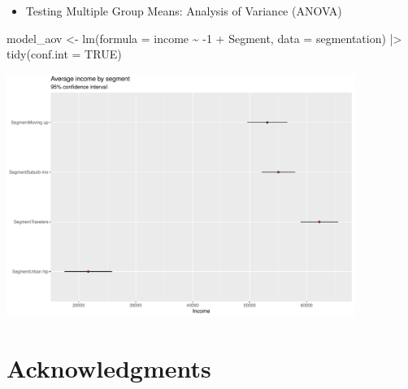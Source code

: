 \documentclass[
  ignorenonframetext,
]{beamer}
\newenvironment{Shaded}{\begin{snugshade}}{\end{snugshade}}
\newcommand{\AttributeTok}[1]{\textcolor[rgb]{0.40,0.45,0.13}{#1}}
\newcommand{\ConstantTok}[1]{\textcolor[rgb]{0.56,0.35,0.01}{#1}}
\newcommand{\DecValTok}[1]{\textcolor[rgb]{0.68,0.00,0.00}{#1}}
\newcommand{\FunctionTok}[1]{\textcolor[rgb]{0.28,0.35,0.67}{#1}}
\newcommand{\NormalTok}[1]{\textcolor[rgb]{0.00,0.23,0.31}{#1}}
\newcommand{\OtherTok}[1]{\textcolor[rgb]{0.00,0.23,0.31}{#1}}
\newcommand{\SpecialCharTok}[1]{\textcolor[rgb]{0.37,0.37,0.37}{#1}}
\providecommand{\tightlist}{%
  \setlength{\itemsep}{0pt}\setlength{\parskip}{0pt}}\usepackage{longtable,booktabs,array}
\begin{document}
\begin{frame}[fragile]{}
\label{section-39}
\begin{itemize}
\tightlist
\item
  Testing Multiple Group Means: Analysis of Variance (ANOVA)
\end{itemize}

\tiny

\begin{Shaded}
\begin{Highlighting}[]
\NormalTok{model\_aov }\OtherTok{\textless{}{-}} \FunctionTok{lm}\NormalTok{(}\AttributeTok{formula =}\NormalTok{ income }\SpecialCharTok{\textasciitilde{}} \SpecialCharTok{{-}}\DecValTok{1} \SpecialCharTok{+}\NormalTok{ Segment,}
                 \AttributeTok{data =}\NormalTok{ segmentation) }\SpecialCharTok{|\textgreater{}} 
  \FunctionTok{tidy}\NormalTok{(}\AttributeTok{conf.int =} \ConstantTok{TRUE}\NormalTok{)}
\end{Highlighting}
\end{Shaded}

\begin{center}
\includegraphics[width=0.85\textwidth,height=\textheight]{006_comparing_groups_statistical_tests_files/figure-beamer/unnamed-chunk-36-1.pdf}
\end{center}
\end{frame}

\section{Acknowledgments}\label{acknowledgments}
\end{document}

